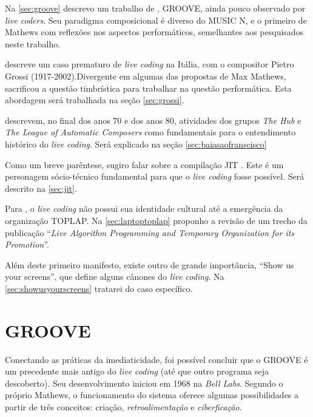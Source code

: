 
Na \autoref{sec:groove} descrevo um trabalho de , GROOVE, ainda pouco observado por \emph{live coders}. Seu paradigma composicional é diverso do MUSIC N, e o primeiro de Mathews com reflexões nos aspectos performáticos, semelhantes aos pesquisados neste trabalho.

  descreve um caso prematuro de \emph{live coding} na Itália, com o compositor Pietro Grossi (1917-2002).Divergente em algumas das propostas de Max Mathews, sacrificou a questão timbrística para trabalhar na questão performática. Esta abordagem será trabalhada na seção \autoref{sec:grossi}.

 descrevem, no final dos anos 70 e dos anos 80, atividades dos grupos \emph{The Hub} e \emph{The League of Automatic Composers} como fundamentais para o entendimento histórico do \emph{live coding}. Será explicado na seção \autoref{sec:baiasaofranscisco}

Como um breve parêntese, sugiro falar sobre a compilação JIT \cite{aycock_brief_2003}. Este é um personagem sócio-técnico fundamental para que o \emph{live coding} fosse possível. Será descrito na \autoref{sec:jit}.

Para , o \emph{live coding} não possui sua identidade cultural até a emergência da organização TOPLAP. Na \autoref{sec:laptoptoplap} proponho a revisão de um trecho da publicação ``\emph{Live Algorithm Programming and Temporary Organization for its Promotion}''.

Além deste primeiro manifesto, existe outro de grande importância, ``Show us your screens'', que define alguns cânones do \emph{live coding}. Na \autoref{sec:showusyourscreens} tratarei do caso específico.

\section{GROOVE}\label{sec:groove}

Conectando as práticas da imediaticidade, foi possível concluir que o GROOVE \cite{mathews_groove_1970,di_nunzio_genesi_2010} é um precedente mais antigo do \emph{live coding} (até que outro programa seja descoberto). Seu desenvolvimento iniciou em 1968 na \emph{Bell Labs}. Segundo o próprio Mathews, o funcionamento do sistema oferece algumas possibilidades a partir de três conceitos: criação, \emph{retroalimentação} e \emph{ciberficação}. 

